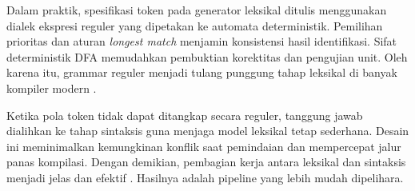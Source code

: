 \documentclass[../main.tex]{subfiles}
\begin{document}
Dalam praktik, spesifikasi token pada generator leksikal ditulis menggunakan dialek ekspresi reguler yang dipetakan ke automata deterministik. Pemilihan prioritas dan aturan \emph{longest match} menjamin konsistensi hasil identifikasi. Sifat deterministik DFA memudahkan pembuktian korektitas dan pengujian unit. Oleh karena itu, grammar reguler menjadi tulang punggung tahap leksikal di banyak kompiler modern \citep{FlexManual}.

\IfSubfilesClassLoaded{


}{}

Ketika pola token tidak dapat ditangkap secara reguler, tanggung jawab dialihkan ke tahap sintaksis guna menjaga model leksikal tetap sederhana. Desain ini meminimalkan kemungkinan konflik saat pemindaian dan mempercepat jalur panas kompilasi. Dengan demikian, pembagian kerja antara leksikal dan sintaksis menjadi jelas dan efektif \citep{WikiRegex}. Hasilnya adalah pipeline yang lebih mudah dipelihara.

\IfSubfilesClassLoaded{%


}{}
\end{document}
